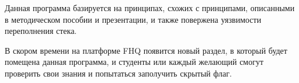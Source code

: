Данная программа базируется на принципах, схожих с принципами, описанными в методическом пособии и презентации, и также повержена уязвимости переполнения стека.\par 
В скором времени на платформе FHQ появится новый раздел, в который будет помещена данная программа, и студенты или каждый желающий смогут проверить свои знания и попытаться заполучить скрытый флаг.\par
\clearpage